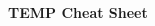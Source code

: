 \documentclass[10pt,a4paper,landscape]{article}
\begin{document}
\raggedright
\footnotesize

\begin{multicols*}{4}

\setlength{\columnseprule}{0.25pt}
\setlength{\premulticols}{1pt}
\setlength{\postmulticols}{1pt}
\setlength{\multicolsep}{1pt}
\setlength{\columnsep}{2pt}

\begin{center}
     \small{\textbf{TEMP Cheat Sheet}} \\
\end{center}

\tiny



\end{multicols*}
\end{document}
